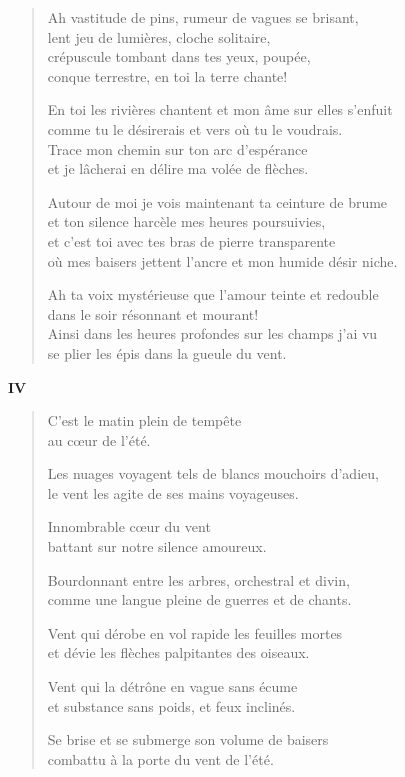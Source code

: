 \documentclass[11pt,a4paper]{book}
\begin{document}
\begin{verse}
  Ah vastitude de pins, rumeur de vagues se brisant, \\
  lent jeu de lumières, cloche solitaire, \\
  crépuscule tombant dans tes  yeux, poupée, \\
  conque terrestre, en toi la terre chante!

  En toi les rivières chantent et mon âme sur elles s'enfuit \\
  comme tu le désirerais et vers où tu le voudrais. \\
  Trace mon chemin sur ton arc d'espérance \\
  et je lâcherai en délire ma volée de flèches.

  Autour de moi je vois maintenant ta ceinture de brume \\
  et ton silence harcèle mes heures poursuivies, \\
  et c'est toi avec tes bras de pierre transparente \\
  où mes baisers jettent l'ancre et mon humide désir niche.

  Ah ta voix mystérieuse que l'amour teinte et redouble \\
  dans le soir résonnant et mourant! \\
  Ainsi dans les heures profondes sur les champs j'ai vu \\
  se plier les épis dans la gueule du vent.
\end{verse}

\newpage


\begin{center} \textbf{IV} \end{center}

\bigskip

\begin{verse}
  C'est le matin plein de tempête \\
  au cœur de l'été.

  Les nuages voyagent tels de blancs mouchoirs d'adieu, \\
  le vent les agite de ses mains voyageuses.

  Innombrable cœur du vent \\
  battant sur notre silence amoureux.

  Bourdonnant entre les arbres, orchestral et divin, \\
  comme une langue pleine de guerres et de chants.

  Vent qui dérobe en vol rapide les feuilles mortes \\
  et dévie les flèches palpitantes des oiseaux.

  Vent qui la détrône en vague sans écume \\
  et substance sans poids, et feux inclinés.

  Se brise et se submerge son volume de baisers \\
  combattu à la porte du vent de l'été.
\end{verse}
\end{document}
